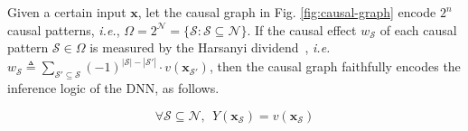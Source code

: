 \begin{theorem}\label{th:harsanyi-faithful}
Given a certain input {\small$\boldsymbol{x}$}, let the causal graph in Fig. \ref{fig:causal-graph} encode {\small$2^n$} causal patterns, \emph{i.e.}, {\small$\Omega=2^{\mathcal{N}}=\{\mathcal{S}: \mathcal{S}\subseteq\mathcal{N}\}$}.
If the causal effect {\small$w_{\mathcal{S}}$} of each causal pattern {\small$\mathcal{S}\in\Omega$} is measured by the Harsanyi dividend~\cite{harsanyi1963simplified}, \emph{i.e.} {\small$w_{\mathcal{S}} \triangleq {\sum}_{\mathcal{S}'\subseteq \mathcal{S}}(-1)^{|\mathcal{S}|-|\mathcal{S}'|}\cdot v(\boldsymbol{x}_{\mathcal{S}'})$}, then the causal graph faithfully encodes the inference logic of the DNN, as follows.
\vspace{-3pt}
\begin{small}
\begin{equation}
    \forall \mathcal{S}\subseteq \mathcal{N},\ \ 
    Y(\boldsymbol{x}_{\mathcal{S}}) = v(\boldsymbol{x}_{\mathcal{S}})
\end{equation}
\end{small}
\end{theorem}
